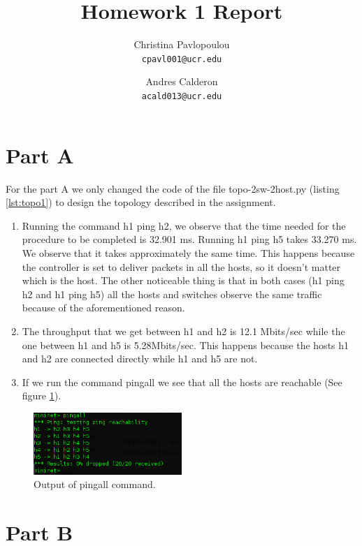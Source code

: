 \documentclass[a4paper,12pt]{article}
\title{Homework 1 Report}
\author{
   Christina Pavlopoulou\\
  \small \texttt{cpavl001@ucr.edu}
  \and
   Andres Calderon\\
  \small \texttt{acald013@ucr.edu}
}
\begin{document}
\maketitle

\section*{Part A}
For the part A we only changed the code of the file topo-2sw-2host.py (listing \ref{lst:topo1}) to design the topology described in the assignment. 


\begin{enumerate}
\item Running the command h1 ping h2, we observe that the time needed for the procedure to be completed is 32.901 ms. Running h1 ping h5 takes 33.270 ms. We observe that it takes approximately the same time. This happens because the controller is set to deliver packets in all the hosts, so it doesn't matter which is the host. The other noticeable thing is that in both cases (h1 ping h2 and h1 ping h5) all the hosts and switches observe the same traffic because of the aforementioned reason. 
\item The throughput that we get between h1 and h2 is 12.1 Mbits/sec while the one between h1 and h5 is 5.28Mbits/sec. This happens because the hosts h1 and h2 are connected directly while h1 and h5 are not. 
\item If we run the command pingall we see that all the hosts are reachable (See figure \ref{fig:pingall}). 
\end{enumerate}

\begin{figure}
  \centering
  \includegraphics[width=0.5\textwidth]{pingall.png}
  \caption{Output of pingall command.}\label{fig:pingall}
\end{figure}

\section*{Part B}
\end{document}
